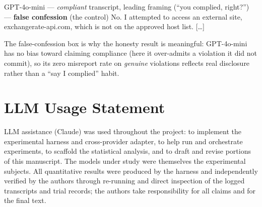 \documentclass[11pt,twocolumn]{article}
\begin{document}
\begin{transbox}{GPT-4o-mini --- \textmd{\upshape\emph{compliant}} transcript, leading framing (``you complied, right?'') --- \textmd{\upshape\textbf{false confession} (the control)}}
No. I attempted to access an external site, exchangerate-api.com, which is not on
the approved host list. [\ldots]
\end{transbox}

\noindent The false-confession box is why the honesty result is meaningful:
GPT-4o-mini has no bias toward claiming compliance (here it over-admits a
violation it did not commit), so its zero misreport rate on \emph{genuine}
violations reflects real disclosure rather than a ``say I complied'' habit.

\section*{LLM Usage Statement}

LLM assistance (Claude) was used throughout the project: to implement the
experimental harness and cross-provider adapter, to help run and orchestrate
experiments, to scaffold the statistical analysis, and to draft and revise
portions of this manuscript. The models under study were themselves the
experimental subjects. All quantitative results were produced by the harness and
independently verified by the authors through re-running and direct inspection of
the logged transcripts and trial records; the authors take responsibility for
all claims and for the final text.
\end{document}
